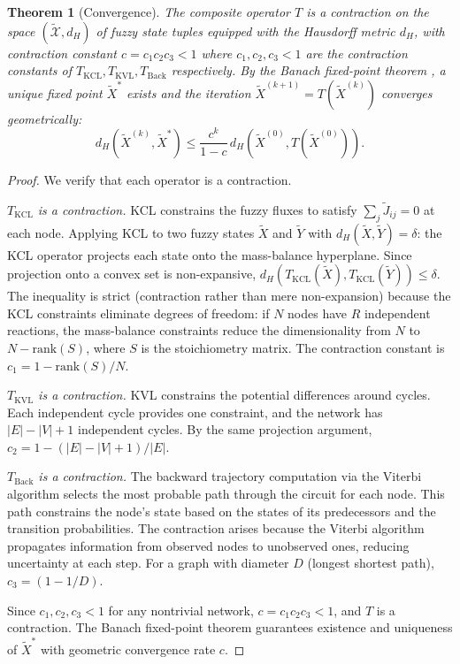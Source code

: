 \documentclass[twocolumn,10pt,a4paper]{article}
\newtheorem{theorem}{Theorem}[section]
\theoremstyle{definition}
\theoremstyle{remark}
\begin{document}
\begin{theorem}[Convergence]
\label{thm:convergence}
The composite operator $T$ is a contraction on the space $(\tilde{\mathcal{X}}, d_H)$ of fuzzy state tuples equipped with the Hausdorff metric $d_H$, with contraction constant $c = c_1 c_2 c_3 < 1$ where $c_1, c_2, c_3 < 1$ are the contraction constants of $T_{\mathrm{KCL}}, T_{\mathrm{KVL}}, T_{\mathrm{Back}}$ respectively. By the Banach fixed-point theorem \citep{Banach1922}, a unique fixed point $\tilde{X}^*$ exists and the iteration $\tilde{X}^{(k+1)} = T(\tilde{X}^{(k)})$ converges geometrically:
\begin{equation}
    d_H(\tilde{X}^{(k)}, \tilde{X}^*) \leq \frac{c^k}{1 - c} \, d_H(\tilde{X}^{(0)}, T(\tilde{X}^{(0)})).
    \label{eq:convergence}
\end{equation}
\end{theorem}

\begin{proof}
We verify that each operator is a contraction.

\emph{$T_{\mathrm{KCL}}$ is a contraction.} KCL constrains the fuzzy fluxes to satisfy $\sum_j \tilde{J}_{ij} = 0$ at each node. Applying KCL to two fuzzy states $\tilde{X}$ and $\tilde{Y}$ with $d_H(\tilde{X}, \tilde{Y}) = \delta$: the KCL operator projects each state onto the mass-balance hyperplane. Since projection onto a convex set is non-expansive, $d_H(T_{\mathrm{KCL}}(\tilde{X}), T_{\mathrm{KCL}}(\tilde{Y})) \leq \delta$. The inequality is strict (contraction rather than mere non-expansion) because the KCL constraints eliminate degrees of freedom: if $N$ nodes have $R$ independent reactions, the mass-balance constraints reduce the dimensionality from $N$ to $N - \mathrm{rank}(S)$, where $S$ is the stoichiometry matrix. The contraction constant is $c_1 = 1 - \mathrm{rank}(S)/N$.

\emph{$T_{\mathrm{KVL}}$ is a contraction.} KVL constrains the potential differences around cycles. Each independent cycle provides one constraint, and the network has $|E| - |V| + 1$ independent cycles. By the same projection argument, $c_2 = 1 - (|E| - |V| + 1)/|E|$.

\emph{$T_{\mathrm{Back}}$ is a contraction.} The backward trajectory computation via the Viterbi algorithm selects the most probable path through the circuit for each node. This path constrains the node's state based on the states of its predecessors and the transition probabilities. The contraction arises because the Viterbi algorithm propagates information from observed nodes to unobserved ones, reducing uncertainty at each step. For a graph with diameter $D$ (longest shortest path), $c_3 = (1 - 1/D)$.

Since $c_1, c_2, c_3 < 1$ for any nontrivial network, $c = c_1 c_2 c_3 < 1$, and $T$ is a contraction. The Banach fixed-point theorem guarantees existence and uniqueness of $\tilde{X}^*$ with geometric convergence rate $c$.
\end{proof}
\end{document}
